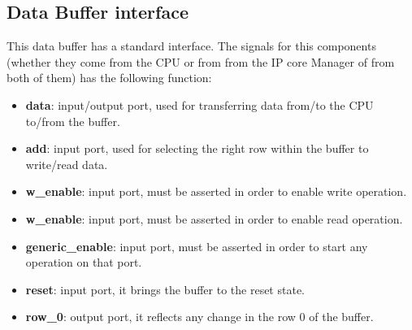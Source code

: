 \subsection{Data Buffer interface}
This data buffer has a standard interface.
The signals for this components (whether they come from the CPU or from from the IP core Manager of from both of them) has the following function: 
\begin{itemize}
	\item \textbf{data}: input/output port, used for transferring data from/to the CPU to/from the buffer. 
	\item \textbf{add}: input port, used for selecting the right row within the buffer to write/read data. 
	\item \textbf{w\_enable}: input port, must be asserted in order to enable write operation. 
		\item \textbf{w\_enable}: input port, must be asserted in order to enable read operation.  
		\item \textbf{generic\_enable}: input port, must be asserted in order to start any operation on that port. 
		\item \textbf{reset}: input port, it brings the buffer to the reset state. 
		\item \textbf{row\_0}: output port, it reflects any change in the row 0 of the buffer. 
\end{itemize}
